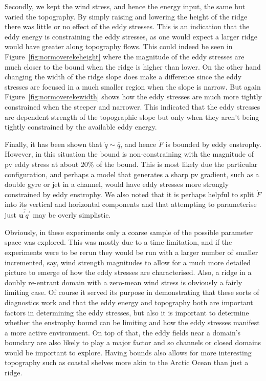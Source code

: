 \documentclass[12pt,a4paper]{report}
\newcommand*\thkmean[1]{\overline{#1}}
\newcommand*\thkres[1]{{#1}^{\prime}}
\newcommand*\spec[1]{\mathring{#1}}
\newcommand*\figref[1]{Figure~\ref{#1}}
\begin{document}
Secondly, we kept the wind stress, and hence the energy input, the same but varied
the topography. By simply raising and lowering the height of the ridge there was
little or no effect of the eddy stresses. This is an indication that the eddy energy 
is constraining the eddy stresses, as one would expect a larger ridge would have
greater along topography flows. This could indeed be seen in \figref{fig:normoverekeheight}
where the magnitude of the eddy stresses are much closer to the bound when the ridge is
 higher than lower. On the other hand changing the width of the ridge slope does make
 a difference since the eddy stresses are focused in a much smaller region when the slope is narrow. But again \figref{fig:normoverekewidth} shows how the eddy stresses are much
 more tightly constrained when the steeper and narrower. This indicated that the eddy
 stresses are dependent strength of the topographic slope but only when they aren't being tightly constrained by the available eddy energy.
 
 Finally, it has been shown that $\spec{q} \sim \thkmean{q}$, and hence $\spec{F}$ is 
 bounded by eddy enstrophy. However, in this situation the bound is non-constraining with
 the magnitude of \gls{pv} eddy  stress at about $20\%$ of the bound. This is most likely
 due the particular configuration, and perhaps a model that generates a sharp \gls{pv}
 gradient, such as a double gyre or jet in a channel, would have eddy stresses more 
 strongly constrained by eddy enstrophy. We also noted that it is perhaps helpful to 
 split $\spec{F}$ into its vertical and horizontal components and that attempting
 to parameterise just $\thkmean{\thkres{\boldsymbol{u}}\thkres{q}}$ may be overly simplistic.

 Obviously, in these experiments only a coarse sample of the possible parameter space was
  explored. This was mostly due to a time limitation, and if the experiments were to be 
  rerun they would be run with a larger number of smaller incremented, say, wind strength
  magnitudes to allow for a much more detailed picture to emerge of how the eddy stresses
  are characterised. Also, a ridge in a doubly re-entrant domain with a zero-mean wind
  stress is obviously a fairly limiting case. Of course it served its purpose
  in demonstrating that these sorts of diagnostics work and that the eddy
  energy and topography both are important factors in determining the eddy stresses, but
  also it is important to determine whether the enstrophy bound can be limiting 
  and how the eddy stresses manifest a more active environment. On top of that, 
  the eddy fields near a domain's boundary are also likely to play a major 
  factor and so channels or closed domains would be important to explore.
  Having bounds also allows for more interesting topography such as 
  coastal shelves more akin to the Arctic Ocean than just a ridge. 
  
\end{document}

